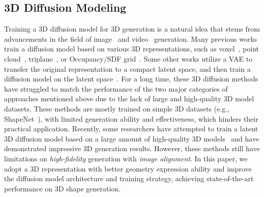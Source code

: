 \subsection{3D Diffusion Modeling}
Training a 3D diffusion model for 3D generation is a natural idea that stems from advancements in the field of image~\cite{rombach2022high,DBLP:conf/icml/RameshPGGVRCS21} and video~\cite{DBLP:conf/iclr/SingerPH00ZHYAG23,DBLP:conf/iccv/WuGWLGSHSQS23} generation.
Many previous works train a diffusion model based on various 3D representations, such as voxel~\cite{DBLP:conf/cvpr/MullerSPBKN23}, point cloud~\cite{DBLP:conf/iccv/ZhouD021,DBLP:conf/nips/zengVWGLFK22,DBLP:conf/cvpr/Melas-Kyriazi0V23}, triplane~\cite{DBLP:conf/cvpr/ShueCPA0W23}, or Occupancy/SDF grid~\cite{DBLP:journals/tog/ZhengPWTLS23,DBLP:conf/siggrapha/HuiLHF22}.
Some other works utilize a VAE to transfer the original representation to a compact latent space, and then train a diffusion model on the latent space~\cite{zhang20233dshape2vecset,DBLP:conf/cvpr/ChengLTSG23}.
For a long time, these 3D diffusion methods have struggled to match the performance of the two major categories of approaches mentioned above due to the lack of large and high-quality 3D model datasets.
These methods are mostly trained on simple 3D datasets (e.g., ShapeNet~\cite{chang2015shapenet}), with limited generation ability and effectiveness, which hinders their practical application.
Recently, some researchers have attempted to train a latent 3D diffusion model based on a large amount of high-quality 3D models~\cite{zhang2024clay,wu2024direct3d,li2024craftsman,lan2024ln3diff,DBLP:journals/corr/abs-2403-02234} and have demonstrated impressive 3D generation results.
However, these methods still have limitations on \emph{high-fidelity} generation with \emph{image alignment}.
In this paper, we adopt a 3D representation with better geometry expression ability and improve the diffusion model architecture and training strategy, achieving state-of-the-art performance on 3D shape generation.




